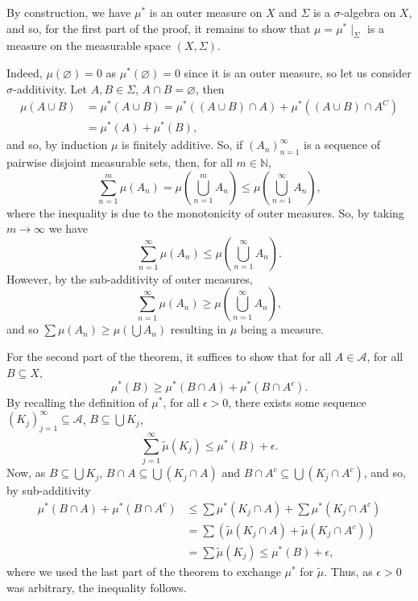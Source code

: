 \documentclass[
]{article}
\theoremstyle{definition}
\theoremstyle{definition}
\begin{document}
By construction, we have \(\mu^*\) is an outer measure on \(X\) and
\(\Sigma\) is a \(\sigma\)-algebra on \(X\), and so, for the first part
of the proof, it remains to show that \(\mu = \mu^*\mid_\Sigma\) is a
measure on the measurable space \((X, \Sigma)\).

Indeed, \(\mu(\varnothing) = 0\) as \(\mu^*(\varnothing) = 0\) since it
is an outer measure, so let us consider \(\sigma\)-additivity. Let
\(A, B \in \Sigma\), \(A \cap B = \varnothing\), then \[\begin{split}
    \mu(A \cup B) & = \mu^*(A \cup B) = \mu^*((A \cup B) \cap A) + \mu^*((A \cup B) \cap A^C) \\
      & = \mu^*(A) + \mu^*(B),
  \end{split}\] and so, by induction \(\mu\) is finitely additive. So,
if \((A_n)_{n = 1}^\infty\) is a sequence of pairwise disjoint
measurable sets, then, for all \(m \in \mathbb{N}\),
\[\sum_{n = 1}^m \mu(A_n) = \mu\left(\bigcup_{n = 1}^m A_n\right) 
    \le \mu\left(\bigcup_{n = 1}^\infty A_n\right),\] where the
inequality is due to the monotonicity of outer measures. So, by taking
\(m \to \infty\) we have
\[\sum_{n = 1}^\infty \mu(A_n) \le \mu\left(\bigcup_{n = 1}^\infty A_n\right).\]
However, by the sub-additivity of outer measures,
\[\sum_{n = 1}^\infty \mu(A_n) \ge \mu\left(\bigcup_{n = 1}^\infty A_n\right),\]
and so \(\sum \mu(A_n) \ge \mu\left(\bigcup A_n\right)\) resulting in
\(\mu\) being a measure.

For the second part of the theorem, it suffices to show that for all
\(A \in \mathcal{A}\), for all \(B \subseteq X\),
\[\mu^*(B) \ge \mu^*(B \cap A) + \mu^*(B \cap A^c).\] By recalling the
definition of \(\mu^*\), for all \(\epsilon > 0\), there exists some
sequence \((K_j)_{j = 1}^\infty \subseteq \mathcal{A}\),
\(B \subseteq \bigcup K_j\),
\[\sum_{j = 1}^\infty \tilde{\mu}(K_j) \le \mu^*(B) + \epsilon.\] Now,
as \(B \subseteq \bigcup K_j\),
\(B \cap A \subseteq \bigcup (K_j \cap A)\) and
\(B \cap A^c \subseteq \bigcup (K_j \cap A^c)\), and so, by
sub-additivity \[\begin{split}
    \mu^*(B \cap A) + \mu^*(B \cap A^c) 
      & \le \sum \mu^*(K_j \cap A) + \sum \mu^* (K_j \cap A^c)\\
      & = \sum (\tilde{\mu} (K_j \cap A) + \tilde{\mu} (K_j \cap A^c))\\
      & = \sum \tilde{\mu}(K_j) \le \mu^*(B) + \epsilon,
  \end{split}\] where we used the last part of the theorem to exchange
\(\mu^*\) for \(\tilde{\mu}\). Thus, as \(\epsilon > 0\) was arbitrary,
the inequality follows.
\end{document}
